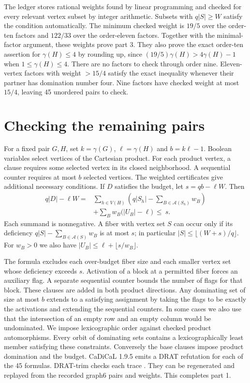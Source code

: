 \documentclass[10pt]{article}
\begin{document}
The ledger stores rational weights found by linear programming and checked
for every relevant vertex subset by integer arithmetic. Subsets with
\(q|S|\ge W\) satisfy the condition automatically. The minimum checked
weight is \(19/5\) over the order-ten factors and \(122/33\) over the order-eleven
factors. Together with the minimal-factor argument, these weights prove
part 3. They also prove the exact order-ten assertion for \(\gamma(H)\le4\)
by rounding up, since \((19/5)\gamma(H)>4\gamma(H)-1\) when \(1\le\gamma(H)\le4\).
There are no factors to check through order nine. Eleven-vertex factors
with weight \(>15/4\) satisfy the exact inequality whenever their partner
has domination number four. Nine factors have checked weight
at most \(15/4\), leaving 45 unordered pairs to check.

\section{Checking the remaining pairs}

For a fixed pair \(G,H\), set \(k=\gamma(G)\), \(\ell=\gamma(H)\) and
\(b=k\ell-1\). Boolean variables select vertices of the Cartesian product.
For each product vertex, a clause requires some selected vertex in its
closed neighborhood. A sequential counter requires at most \(b\) selected
vertices. The weighted certificates give additional necessary conditions.
If \(D\) satisfies the budget, let \(s=qb-\ell W\). Then
\[
\begin{split}
q|D|-\ell W
={}&\sum_{h\in V(H)}\left(q|S_h|-\sum_{B\in\mathcal A(S_h)}w_B\right)\\
 &+\sum_B w_B\bigl(|U_B|-\ell\bigr) \ \le\ s.
\end{split}
\]
Each summand is nonnegative. A fiber with vertex set \(S\) can occur only
if its deficiency \(q|S|-\sum_{B\in\mathcal A(S)}w_B\) is at most \(s\);
in particular \(|S|\le\lfloor(W+s)/q\rfloor\).
For \(w_B>0\) we also have
\(|U_B|\le\ell+\lfloor s/w_B\rfloor\).

The formula excludes each over-budget fiber size and each smaller vertex set
whose deficiency exceeds \(s\). Activation of a block at a permitted fiber
forces an auxiliary flag. A separate sequential counter bounds the number
of flags for that block. These clauses are added in both product directions.
Any dominating set of size at most \(b\) extends to a satisfying assignment
by taking the flags to be exactly the activations and extending the sequential
counters. In some cases we also use that the intersection of an empty row
and an empty column would be undominated. We impose lexicographic order
against checked product automorphisms. Every orbit of dominating sets
contains a lexicographically least member satisfying these constraints.
Conversely the base clauses impose product domination and the budget.
CaDiCaL 1.9.5 emits a DRAT refutation for each of the 45 formulas.
DRAT-trim checks each trace \cite{drat}. They can be regenerated and replayed from the
recorded graph6 pairs and weights. This completes part 1.
\end{document}
